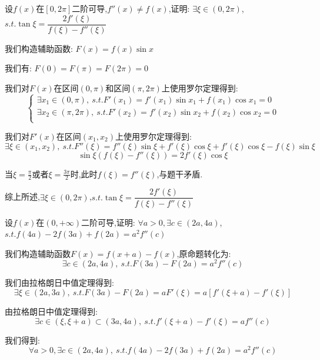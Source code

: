 \begin{proposition}
	设$f(x)$在$[0,2\pi]$二阶可导,$f''(x)\neq f(x)$,证明: $\exists \xi\in(0,2\pi)$,$s.t. \tan\xi=\dfrac{2f'(\xi)}{f(\xi)-f''(\xi)}$
\end{proposition}
\begin{solution}

	我们构造辅助函数: $F(x)=f(x)\sin x$

	我们有: $F(0)=F(\pi)=F(2\pi)=0$

	我们对$F(x)$在区间$(0,\pi)$和区间$(\pi,2\pi)$上使用罗尔定理得到:
	$$\left\lbrace
		\begin{array}{l}
			\exists x_{1}\in(0,\pi),\ s.t. F'(x_{1})=f'(x_{1})\sin x_{1}+f(x_{1})\cos x_{1}=0    \\
			\exists x_{2}\in(\pi,2\pi),\ s.t. F'(x_{2})=f'(x_{2})\sin x_{2}+f(x_{2})\cos x_{2}=0 \\
		\end{array}
		\right. $$

	我们对$F'(x)$在区间$(x_{1},x_{2})$上使用罗尔定理得到:
	$$\exists \xi\in(x_{1},x_{2}),\ s.t. F''(\xi)=f''(\xi)\sin \xi+f'(\xi)\cos\xi+f'(\xi)\cos\xi-f(\xi)\sin \xi$$ $$\sin\xi(f(\xi)-f''(\xi))=2f'(\xi)\cos \xi$$

	当$\xi=\frac{\pi}{2}$或者$\xi=\frac{3\pi}{2}$时,此时$f(\xi)=f''(\xi)$,与题干矛盾.

	综上所述,$\exists \xi\in(0,2\pi)$,$s.t. \tan\xi=\dfrac{2f'(\xi)}{f(\xi)-f''(\xi)}$
\end{solution}


\begin{proposition}
	设$f(x)$在$(0,+\infty)$二阶可导,证明: $\forall a>0,\exists c\in(2a,4a)$,$s.t. f(4a)-2f(3a)+f(2a)=a^2f''(c)$
\end{proposition}

\begin{solution}

	我们构造辅助函数$F(x)=f(x+a)-f(x)$,原命题转化为:
	$$\exists c\in(2a,4a),\ s.t. F(3a)-F(2a)=a^2f''(c)$$

	我们由拉格朗日中值定理得到:
	$$\exists \xi\in(2a,3a),\ s.t. F(3a)-F(2a)=aF'(\xi)=a[f'(\xi+a)-f'(\xi)]$$

	由拉格朗日中值定理得到:
	$$\exists c\in(\xi,\xi+a)\subset (3a,4a),\ s.t. f'(\xi+a)-f'(\xi)=af''(c)$$

	我们得到:
	$$\forall a>0,\exists c\in(2a,4a),\ s.t. f(4a)-2f(3a)+f(2a)=a^2f''(c)$$
\end{solution}

